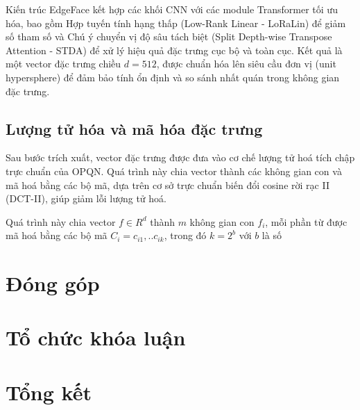 Kiến trúc EdgeFace kết hợp các khối CNN với các module Transformer tối ưu hóa, bao gồm Hợp tuyến tính hạng thấp (Low-Rank Linear - LoRaLin) để giảm số tham số và Chú ý chuyển vị độ sâu tách biệt (Split Depth-wise Transpose Attention - STDA) để xử lý hiệu quả đặc trưng cục bộ và toàn cục. Kết quả là một vector đặc trưng chiều $ d = 512 $, được chuẩn hóa lên siêu cầu đơn vị (unit hypersphere) để đảm bảo tính ổn định và so sánh nhất quán trong không gian đặc trưng.

\subsection{Lượng tử hóa và mã hóa đặc trưng}
Sau bước trích xuất, vector đặc trưng được đưa vào cơ chế lượng tử hoá tích chập trực chuẩn của OPQN. Quá trình này chia vector thành các không gian con và mã hoá bằng các bộ mã, dựa trên cơ sở trực chuẩn biến đổi cosine rời rạc II (DCT-II), giúp giảm lỗi lượng tử hoá. 

Quá trình này chia vector $f \in R^d$ thành $m$ không gian con $f_i$, mỗi phần từ được mã hoá bằng các bộ mã $C_i = {c_{i1},..c_{ik}}$, trong đó $k = 2^b$ với $b$ là số 

\section{Đóng góp}
\section{Tổ chức khóa luận}
\section{Tổng kết}

\newpage



